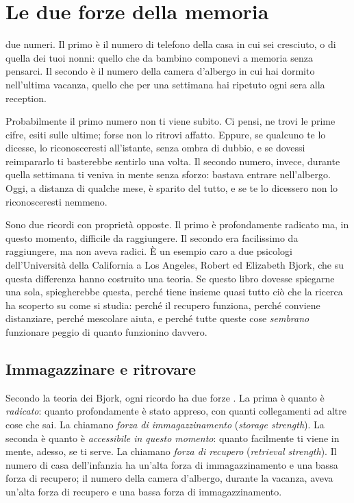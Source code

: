 \chapter{Le due forze della memoria}
\label{cap:dueforze}


 due numeri. Il primo è il numero di
telefono della casa in cui sei cresciuto, o di quella dei tuoi nonni:
quello che da bambino componevi a memoria senza pensarci. Il secondo è
il numero della camera d'albergo in cui hai dormito nell'ultima vacanza,
quello che per una settimana hai ripetuto ogni sera alla reception.

Probabilmente il primo numero non ti viene subito. Ci pensi, ne trovi
le prime cifre, esiti sulle ultime; forse non lo ritrovi affatto. Eppure,
se qualcuno te lo dicesse, lo riconosceresti all'istante, senza ombra di
dubbio, e se dovessi reimpararlo ti basterebbe sentirlo una volta. Il
secondo numero, invece, durante quella settimana ti veniva in mente
senza sforzo: bastava entrare nell'albergo. Oggi, a distanza di qualche
mese, è sparito del tutto, e se te lo dicessero non lo riconosceresti
nemmeno.

Sono due ricordi con proprietà opposte. Il primo è profondamente
radicato ma, in questo momento, difficile da raggiungere. Il secondo era
facilissimo da raggiungere, ma non aveva radici. È un esempio caro a due
psicologi dell'Università della California a Los Angeles, Robert ed
Elizabeth Bjork, che su questa differenza hanno costruito una teoria.
Se questo libro dovesse spiegarne una sola, spiegherebbe questa, perché
tiene insieme quasi tutto ciò che la ricerca ha scoperto su come si
studia: perché il recupero funziona, perché conviene distanziare,
perché mescolare aiuta, e perché tutte queste cose \emph{sembrano}
funzionare peggio di quanto funzionino davvero.

\section{Immagazzinare e ritrovare}

Secondo la teoria dei Bjork, ogni ricordo ha due forze
\parencite{bjork1992}. La prima è quanto è \emph{radicato}: quanto
profondamente è stato appreso, con quanti collegamenti ad altre cose
che sai. La chiamano \emph{forza di immagazzinamento} (\emph{storage
strength}). La seconda è quanto è \emph{accessibile in questo momento}:
quanto facilmente ti viene in mente, adesso, se ti serve. La chiamano
\emph{forza di recupero} (\emph{retrieval strength}). Il numero di casa
dell'infanzia ha un'alta forza di immagazzinamento e una bassa forza di
recupero; il numero della camera d'albergo, durante la vacanza, aveva
un'alta forza di recupero e una bassa forza di immagazzinamento.

